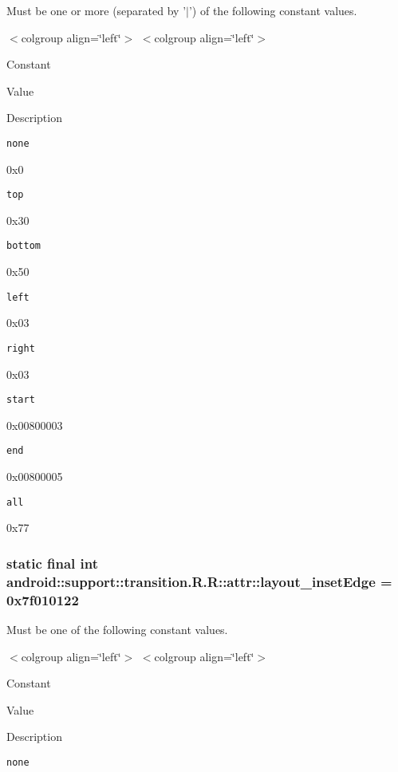 Must be one or more (separated by '$|$') of the following constant values. \begin{TabularC}{0}
\hline
\end{TabularC}
$<$colgroup align=\char`\"{}left\char`\"{}$>$ $<$colgroup align=\char`\"{}left\char`\"{}$>$ 

Constant

Value

Description 

{\tt none}

0x0

{\tt top}

0x30

{\tt bottom}

0x50

{\tt left}

0x03

{\tt right}

0x03

{\tt start}

0x00800003

{\tt end}

0x00800005

{\tt all}

0x77\hypertarget{classandroid_1_1support_1_1transition_1_1_r_1_1attr_568f00a8730782a703351dec5c12ccb5}{
\subsubsection[{layout\_\-insetEdge}]{\setlength{\rightskip}{0pt plus 5cm}static final int android::support::transition.R.R::attr::layout\_\-insetEdge = 0x7f010122}}
\label{classandroid_1_1support_1_1transition_1_1_r_1_1attr_568f00a8730782a703351dec5c12ccb5}


Must be one of the following constant values. \begin{TabularC}{0}
\hline
\end{TabularC}
$<$colgroup align=\char`\"{}left\char`\"{}$>$ $<$colgroup align=\char`\"{}left\char`\"{}$>$ 

Constant

Value

Description 

{\tt none}

